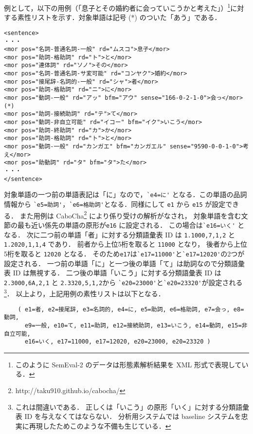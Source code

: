 \documentclass[japanese]{jnlp_1.4}
\begin{document}
例として，以下の用例（「息子とその婚約者に会っていこうかと考えた」）\footnote{このように SemEval-2 のデータは形態素解析結果を XML 形式で表現している．}に対する素性リストを示す．対象単語は記号 (*) のついた「あう」である．

\vspace{0.5\Cvs}
\begin{screen}
\small
\begin{verbatim}
<sentence>
・・・
<mor pos="名詞-普通名詞-一般" rd="ムスコ">息子</mor>
<mor pos="助詞-格助詞" rd="ト">と</mor>
<mor pos="連体詞" rd="ソノ">その</mor>
<mor pos="名詞-普通名詞-サ変可能" rd="コンヤク">婚約</mor>
<mor pos="接尾辞-名詞的-一般" rd="シャ">者</mor>
<mor pos="助詞-格助詞" rd="ニ">に</mor>
<mor pos="動詞-一般" rd="アッ" bfm="アウ" sense="166-0-2-1-0">会っ</mor>  (*)
<mor pos="助詞-接続助詞" rd="テ">て</mor>
<mor pos="動詞-非自立可能" rd="イコー" bfm="イク">いこう</mor>
<mor pos="助詞-終助詞" rd="カ">か</mor>
<mor pos="助詞-格助詞" rd="ト">と</mor>
<mor pos="動詞-一般" rd="カンガエ" bfm="カンガエル" sense="9590-0-0-1-0">考え</mor>
<mor pos="助動詞" rd="タ" bfm="タ">た</mor>
・・・
</sentence>
\end{verbatim}
\end{screen}
\vspace{0.5\Cvs}

対象単語の一つ前の単語表記は「に」なので，\verb|`e4=に'| となる．この単語の品詞情報から
\linebreak
\verb|`e5=助詞'|，\verb|`e6=格助詞'|となる．同様にして \verb|e1| から \verb|e15| が設定できる．
また用例は CaboCha\footnote{http://taku910.github.io/cabocha/} により係り受けの解析がなされ，
対象単語を含む文節の最も近い係先の単語の原形が\verb|e16| に設定される．
この場合は\verb|`e16=いく'| となる．
次に二つ前の単語「者」に対する分類語彙表 ID は
\verb|1.1000,7,1,2| と\verb|1.2020,1,1,4| であり．
前者から上位5桁を取ると \verb|11000| となり，
後者から上位5桁を取ると \verb|12020| となる．
そのため\verb|e17|は\verb|`e17=11000'|と\verb|`e17=12020'|の2つが設定される．
一つ前の単語「に」と一つ後の単語「て」は助詞なので分類語彙表 ID は無視する．
二つ後の単語「いこう」に対する分類語彙表 ID は
\verb|2.3000,6A,2,1| と \verb|2.3320,5,1,2|から
\verb|`e20=23000'|と\verb|`e20=23320'|が設定される\footnote{これは間違いである．
正しくは「いこう」の原形「いく」に対する分類語彙表 ID を与えなくてはならない．
分析用システムでは baseline システムを忠実に再現したためこのような不備も生じている．}．
以上より，上記用例の素性リストは以下となる．

\vspace{0.5\Cvs}
\small
\begin{verbatim}
    ( e1=者, e2=接尾辞, e3=名詞的, e4=に, e5=助詞, e6=格助詞, e7=会っ, e8=動詞,
      e9=一般, e10=て, e11=助詞, e12=接続助詞, e13=いこう, e14=動詞, e15=非自立可能, 
      e16=いく, e17=11000, e17=12020, e20=23000, e20=23320 )
\end{verbatim}
\normalsize
\vspace{0.5\Cvs}
\end{document}
